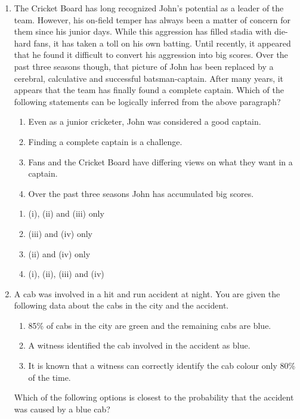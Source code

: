 \documentclass[a4paper, 11pt]{article}
\begin{document}
\begin{enumerate}
    \item The Cricket Board has long recognized John's potential as a leader of the team. However, his on-field temper has always been a matter of concern for them since his junior days. While this aggression has filled stadia with die-hard fans, it has taken a toll on his own batting. Until recently, it appeared that he found it difficult to convert his aggression into big scores. Over the past three seasons though, that picture of John has been replaced by a cerebral, calculative and successful batsman-captain. After many years, it appears that the team has finally found a complete captain.
    Which of the following statements can be logically inferred from the above paragraph?
    \begin{enumerate}[label=(\roman*)]
        \item Even as a junior cricketer, John was considered a good captain.
        \item Finding a complete captain is a challenge.
        \item Fans and the Cricket Board have differing views on what they want in a captain.
        \item Over the past three seasons John has accumulated big scores.
    \end{enumerate}
    \begin{enumerate}
        \item (i), (ii) and (iii) only
        \item (iii) and (iv) only
        \item (ii) and (iv) only
        \item (i), (ii), (iii) and (iv)
    \end{enumerate}

    \hfill{}

    \item A cab was involved in a hit and run accident at night. You are given the following data about the cabs in the city and the accident.
    \begin{enumerate}[label=(\roman*)]
        \item 85\% of cabs in the city are green and the remaining cabs are blue.
        \item A witness identified the cab involved in the accident as blue.
        \item It is known that a witness can correctly identify the cab colour only 80\% of the time.
    \end{enumerate}
    Which of the following options is closest to the probability that the accident was caused by a blue cab?
    \begin{enumerate}
    \end{enumerate}


\end{enumerate}
\end{document}
